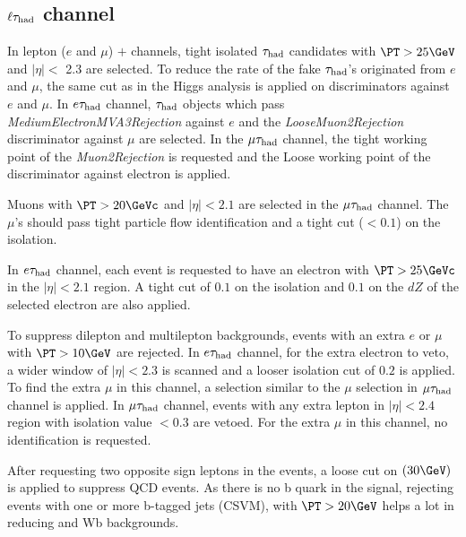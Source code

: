 \subsection{\texorpdfstring{$\ell\tau_{\rm had}$ channel}{lepton-tau channel}}
\label{sect:leptonTauCuts}
In lepton ($e$ and $\mu$) $+$ \Tau channels, tight isolated $\tau_{\rm had}$ candidates with $\PT > 25 \GeV$ and $|\eta| <$ 2.3 are selected. To reduce the rate of the fake $\tau_{\rm had}$'s originated from $e$ and $\mu$, the same cut as in the Higgs analysis \cite{CMS_AN_2013-171} is applied on discriminators against $e$ and $\mu$. In $e\tau_{\rm had}$ channel, $\tau_{\rm had}$ objects which pass \emph{MediumElectronMVA3Rejection} against $e$ and the \emph{LooseMuon2Rejection} discriminator against $\mu$ are selected. In the $\mu\tau_{\rm had}$ channel, the tight working point of the \emph{Muon2Rejection} is requested and the Loose working point of the discriminator against electron is applied.

Muons with $\PT > 20 \GeVc$ and $|\eta|<2.1$ are selected in the $\mu\tau_{\rm had}$ channel. The $\mu$'s should pass tight particle flow identification and a tight cut ($<0.1$) on the isolation.
 
In $e\tau_{\rm had}$ channel, each event is requested to have an electron with $\PT >25 \GeVc$ in the $|\eta| < 2.1 $ region. A tight cut of $0.1$ on the isolation and $0.1$ on the $dZ$ of the selected electron are also applied.

To suppress dilepton and multilepton backgrounds, events with an extra $e$ or $\mu$ with $\PT >10 \GeV$ are rejected. In $e\tau_{\rm had}$ channel, for the extra electron to veto, a wider window of $|\eta|<2.3$ is scanned and a looser isolation cut of $0.2$ is applied. To find the extra $\mu$ in this channel, a selection similar to the $\mu$ selection in $\mu\tau_{\rm had}$ channel is applied. In $\mu\tau_{\rm had}$ channel, events with any extra lepton in $|\eta|<2.4$ region with isolation value $<0.3$ are vetoed. For the extra $\mu$ in this channel, no identification is requested.


After requesting two opposite sign leptons in the events, a loose cut on \MPT $(30 \GeV)$ is applied to suppress QCD events. As there is no b quark in the signal, rejecting events with one or more b-tagged jets (CSVM), with $\PT > 20 \GeV$ helps a lot in reducing \ttbar and Wb backgrounds.

